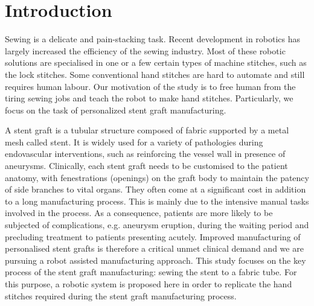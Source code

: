 \section{Introduction}

Sewing is a delicate and pain-stacking task. Recent development in robotics has largely increased the efficiency of the sewing industry. Most of these robotic solutions are specialised in one or a few certain types of machine stitches, such as the lock stitches. Some conventional hand stitches are hard to automate and still requires human labour. Our motivation of the study is to free human from the tiring sewing jobs and teach the robot to make hand stitches. Particularly, we focus on the task of personalized stent graft manufacturing.

A stent graft is a tubular structure composed of fabric supported by a metal mesh called stent. It is widely used for a variety of pathologies during endovascular interventions, such as reinforcing the vessel wall in presence of aneurysms.
Clinically, each stent graft needs to be customised to the patient anatomy, with fenestrations (openings) on the graft body to maintain the patency of side branches to vital organs. They often come at a significant cost in addition to a long manufacturing process. This is mainly due to the intensive manual tasks involved in the process. As a consequence, patients are more likely to be subjected of complications, e.g. aneurysm eruption, during the waiting period and precluding treatment to patients presenting acutely. Improved manufacturing of personalised stent grafts is therefore a critical unmet clinical demand and we are pursuing a robot assisted manufacturing approach. This study focuses on the key process of the stent graft manufacturing: sewing the stent to a fabric tube. For this purpose, a robotic system is proposed here in order to replicate the hand stitches required during the stent graft manufacturing process.



